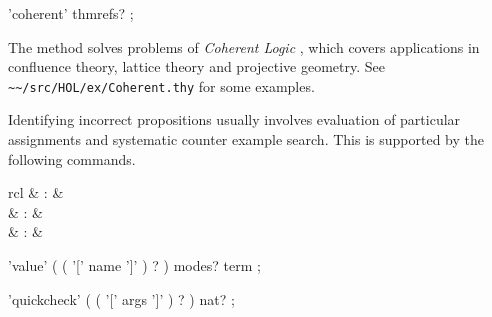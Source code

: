\begin{isabellebody}
\begin{isamarkuptext}
  \begin{rail}
    'coherent' thmrefs?
    ;
  \end{rail}

  The \hyperlink{method.HOL.coherent}{\mbox{}} method solves problems of
  \emph{Coherent Logic} \cite{Bezem-Coquand:2005}, which covers
  applications in confluence theory, lattice theory and projective
  geometry.  See \verb|~~/src/HOL/ex/Coherent.thy| for some
  examples.%
\end{isamarkuptext}%
\isamarkuptrue%
%
\isamarkuptrue%
%
\begin{isamarkuptext}%
Identifying incorrect propositions usually involves evaluation of
  particular assignments and systematic counter example search.  This
  is supported by the following commands.

  \begin{matharray}{rcl}
    \hypertarget{command.HOL.value}{\hyperlink{command.HOL.value}{\mbox{}}} & : &  \\
    \hypertarget{command.HOL.quickcheck}{\hyperlink{command.HOL.quickcheck}{\mbox{}}} & : &  \\
    \hypertarget{command.HOL.quickcheck-params}{\hyperlink{command.HOL.quickcheck-params}{\mbox{}}} & : & 
  \end{matharray}

  \begin{rail}
    'value' ( ( '[' name ']' ) ? ) modes? term
    ;

    'quickcheck' ( ( '[' args ']' ) ? ) nat?
    ;


\end{rail}
\end{isamarkuptext}
\end{isabellebody}
